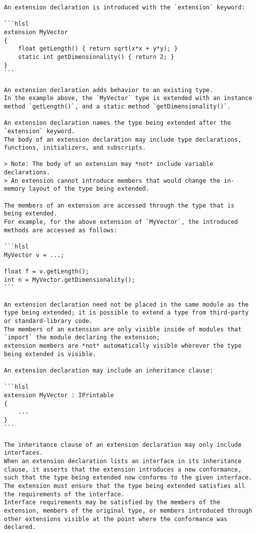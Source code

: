 \begin{verbatim}
An extension declaration is introduced with the `extension` keyword:

```hlsl
extension MyVector
{
    float getLength() { return sqrt(x*x + y*y); }
    static int getDimensionality() { return 2; }
}
```

An extension declaration adds behavior to an existing type.
In the example above, the `MyVector` type is extended with an instance method `getLength()`, and a static method `getDimensionality()`.

An extension declaration names the type being extended after the `extension` keyword.
The body of an extension declaration may include type declarations, functions, initializers, and subscripts.

> Note: The body of an extension may *not* include variable declarations.
> An extension cannot introduce members that would change the in-memory layout of the type being extended.

The members of an extension are accessed through the type that is being extended.
For example, for the above extension of `MyVector`, the introduced methods are accessed as follows:

```hlsl
MyVector v = ...;

float f = v.getLength();
int n = MyVector.getDimensionality();
```

An extension declaration need not be placed in the same module as the type being extended; it is possible to extend a type from third-party or standard-library code.
The members of an extension are only visible inside of modules that `import` the module declaring the extension;
extension members are *not* automatically visible wherever the type being extended is visible.

An extension declaration may include an inheritance clause:

```hlsl
extension MyVector : IPrintable
{
    ...
}
```

The inheritance clause of an extension declaration may only include interfaces.
When an extension declaration lists an interface in its inheritance clause, it asserts that the extension introduces a new conformance, such that the type being extended now conforms to the given interface.
The extension must ensure that the type being extended satisfies all the requirements of the interface.
Interface requirements may be satisfied by the members of the extension, members of the original type, or members introduced through other extensions visible at the point where the conformance was declared.


\end{verbatim}
